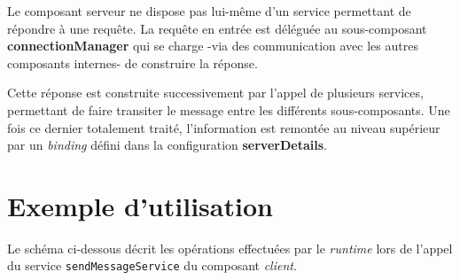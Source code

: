         Le composant serveur ne dispose pas lui-même d'un service permettant de répondre à une requête. La requête en entrée est déléguée au sous-composant \textbf{connectionManager} qui se charge -via des communication avec les autres composants internes- de construire la réponse.
        
        
        Cette réponse est construite successivement par l'appel de plusieurs services, permettant de faire transiter le message entre les différents sous-composants. Une fois ce dernier totalement traité, l'information est remontée au niveau supérieur par un \emph{binding} défini dans la configuration \textbf{serverDetails}.
        
	\section{Exemple d'utilisation}
    	Le schéma ci-dessous décrit les opérations effectuées par le \emph{runtime} lors de l'appel du service \lstinline{sendMessageService} du composant \emph{client}.
        
